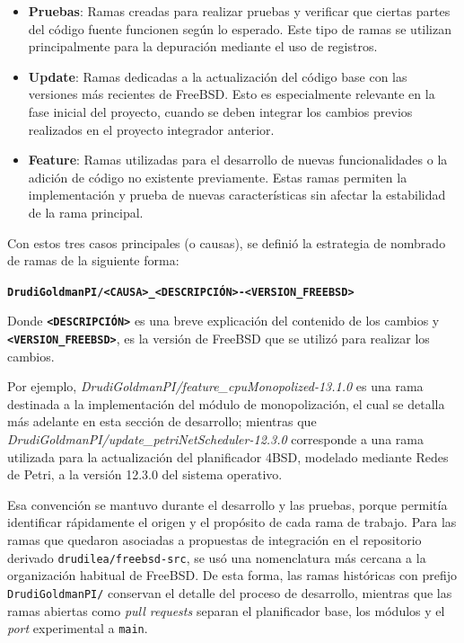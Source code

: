 \begin{itemize}
    \item \textbf{Pruebas}: Ramas creadas para realizar pruebas y verificar que ciertas partes del código fuente funcionen según lo esperado. Este tipo de ramas se utilizan principalmente para la depuración mediante el uso de registros.
    \item \textbf{Update}: Ramas dedicadas a la actualización del código base con las versiones más recientes de FreeBSD. Esto es especialmente relevante en la fase inicial del proyecto, cuando se deben integrar los cambios previos realizados en el proyecto integrador anterior.
    \item \textbf{Feature}: Ramas utilizadas para el desarrollo de nuevas funcionalidades o la adición de código no existente previamente. Estas ramas permiten la implementación y prueba de nuevas características sin afectar la estabilidad de la rama principal.
\end{itemize}

Con estos tres casos principales (o causas), se definió la estrategia de nombrado de ramas de la siguiente forma:

\begin{center}
    \texttt{\textbf{DrudiGoldmanPI/<CAUSA>\_<DESCRIPCIÓN>-<VERSION\_FREEBSD>}}
\end{center}

Donde \texttt{\textbf{<DESCRIPCIÓN>}} es una breve explicación del contenido de los cambios y \texttt{\textbf{<VERSION\_FREEBSD>}}, es la versión de FreeBSD que se utilizó para realizar los cambios.

Por ejemplo, \textit{DrudiGoldmanPI/feature\_cpuMonopolized-13.1.0} es una rama destinada a la implementación del módulo de monopolización, el cual se detalla más adelante en esta sección de desarrollo; mientras que \textit{DrudiGoldmanPI/update\_petriNetScheduler-12.3.0} corresponde a una rama utilizada para la actualización del planificador 4BSD, modelado mediante Redes de Petri, a la versión 12.3.0 del sistema operativo.\par

Esa convención se mantuvo durante el desarrollo y las pruebas, porque permitía identificar rápidamente el origen y el propósito de cada rama de trabajo. Para las ramas que quedaron asociadas a propuestas de integración en el repositorio derivado \texttt{drudilea/freebsd-src}, se usó una nomenclatura más cercana a la organización habitual de FreeBSD. De esta forma, las ramas históricas con prefijo \texttt{DrudiGoldmanPI/} conservan el detalle del proceso de desarrollo, mientras que las ramas abiertas como \textit{pull requests} separan el planificador base, los módulos y el \textit{port} experimental a \texttt{main}.\par

